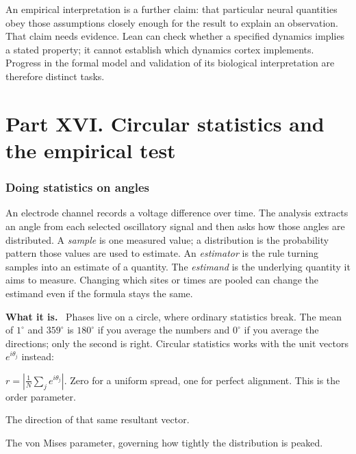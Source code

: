 \documentclass[11pt]{article}
\newcommand{\what}{\par\smallskip\noindent\textbf{What it is.}\ }
\begin{document}
An empirical interpretation is a further claim: that particular neural
quantities obey those assumptions closely enough for the result to explain
an observation. That claim needs evidence. Lean can check whether a specified
dynamics implies a stated property; it cannot establish which dynamics cortex
implements. Progress in the formal model and validation of its biological
interpretation are therefore distinct tasks.

\part*{Part XVI. Circular statistics and the empirical test}
\section{Doing statistics on angles}

An electrode channel records a voltage difference over time. The analysis
extracts an angle from each selected oscillatory signal and then asks how those
angles are distributed. A \emph{sample} is one measured value; a distribution
is the probability pattern those values are used to estimate. An
\emph{estimator} is the rule turning samples into an estimate of a quantity.
The \emph{estimand} is the underlying quantity it aims to measure. Changing
which sites or times are pooled can change the estimand even if the formula
stays the same.

\what
Phases live on a circle, where ordinary statistics break. The mean of
$1^\circ$ and $359^\circ$ is $180^\circ$ if you average the numbers and
$0^\circ$ if you average the directions; only the second is right. Circular
statistics works with the unit vectors $e^{i\theta_j}$ instead:

\begin{description}[leftmargin=*,style=nextline]
\item[Resultant length $r$.] $r=\left|\frac1N\sum_j e^{i\theta_j}\right|$. Zero
for a uniform spread, one for perfect alignment. This is the order parameter.
\item[Circular mean $\psi$.] The direction of that same resultant vector.
\item[Concentration $a$.] The von Mises parameter, governing how tightly the
distribution is peaked.
\end{description}
\end{document}
